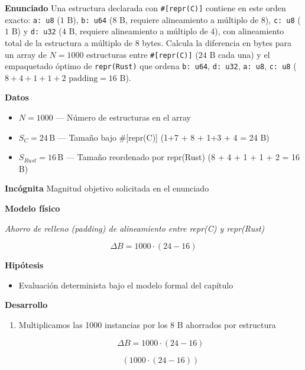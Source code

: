 \documentclass{book}
\begin{document}
\begin{tcolorbox}[title={Problema resuelto}, studiumworked, breakable]

\noindent\textbf{Enunciado}
Una estructura declarada con \texttt{\#[repr(C)]} contiene en este orden exacto: \texttt{a: u8} (\(1\text{ B}\)), \texttt{b: u64} (\(8\text{ B}\), requiere alineamiento a múltiplo de 8), \texttt{c: u8} (\(1\text{ B}\)) y \texttt{d: u32} (\(4\text{ B}\), requiere alineamiento a múltiplo de 4), con alineamiento total de la estructura a múltiplo de 8 bytes. Calcula la diferencia en bytes para un array de \(N = 1000\) estructuras entre \texttt{\#[repr(C)]} (\(24\text{ B}\) cada una) y el empaquetado óptimo de \texttt{repr(Rust)} que ordena \texttt{b: u64}, \texttt{d: u32}, \texttt{a: u8}, \texttt{c: u8} (\(8 + 4 + 1 + 1 + 2\text{ padding} = 16\text{ B}\)).

\noindent\textbf{Datos}
\begin{itemize}
\item $N = 1000$ — Número de estructuras en el array
\item $S_{C} = 24\,\mathrm{B}$ — Tamaño bajo \#[repr(C)] (1+7 + 8 + 1+3 + 4 = 24 B)
\item $S_{Rust} = 16\,\mathrm{B}$ — Tamaño reordenado por repr(Rust) (8 + 4 + 1 + 1 + 2 = 16 B)
\end{itemize}

\noindent\textbf{Incógnita}
Magnitud objetivo solicitada en el enunciado

\noindent\textbf{Modelo físico}

\noindent\textit{Ahorro de relleno (padding) de alineamiento entre repr(C) y repr(Rust)}

\[
\Delta B = 1000 \cdot (24 - 16)
\]

\noindent\textbf{Hipótesis}
\begin{itemize}
\item Evaluación determinista bajo el modelo formal del capítulo
\end{itemize}

\noindent\textbf{Desarrollo}
\begin{enumerate}
\item
Multiplicamos las 1000 instancias por los 8 B ahorrados por estructura

\[
\Delta B = 1000 \cdot (24 - 16)
\]

\[
\left(1000\cdot \left(24-16\right)\right)
\]
\end{enumerate}


\end{tcolorbox}
\end{document}
